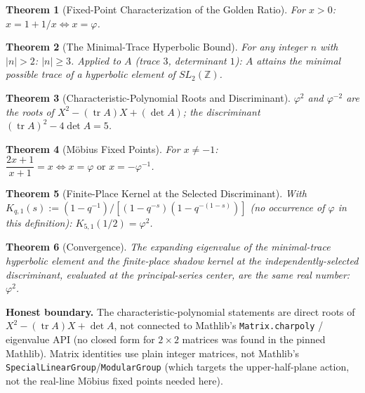 \documentclass{report}
\newtheorem{theorem}{Theorem}[chapter]
\theoremstyle{definition}
\begin{document}
\begin{theorem}[Fixed-Point Characterization of the Golden Ratio]
  \label{thm:golden-fixed-point}
  \leanok
  For $x>0$: $x=1+1/x \iff x=\varphi$.
\end{theorem}

\begin{theorem}[The Minimal-Trace Hyperbolic Bound]
  \label{thm:hyperbolic-trace-bound}
  \leanok
  For any integer $n$ with $|n|>2$: $|n|\geq3$. Applied to $A$ (trace $3$, determinant $1$):
  $A$ attains the minimal possible trace of a hyperbolic element of $SL_2(\mathbb{Z})$.
\end{theorem}

\begin{theorem}[Characteristic-Polynomial Roots and Discriminant]
  \label{thm:golden-charpoly}
  \leanok
  $\varphi^2$ and $\varphi^{-2}$ are the roots of $X^2-(\operatorname{tr}A)X+(\det A)$;
  the discriminant $(\operatorname{tr}A)^2-4\det A = 5$.
\end{theorem}

\begin{theorem}[Möbius Fixed Points]
  \label{thm:golden-mobius}
  \leanok
  For $x\neq-1$: $\dfrac{2x+1}{x+1}=x \iff x=\varphi \text{ or } x=-\varphi^{-1}$.
\end{theorem}

\begin{theorem}[Finite-Place Kernel at the Selected Discriminant]
  \label{thm:golden-kernel}
  \leanok
  With $K_{q,1}(s):=(1-q^{-1})/[(1-q^{-s})(1-q^{-(1-s)})]$ (no occurrence of $\varphi$ in
  this definition): $K_{5,1}(1/2)=\varphi^2$.
\end{theorem}

\begin{theorem}[Convergence]
  \label{thm:golden-convergence}
  \leanok
  The expanding eigenvalue of the minimal-trace hyperbolic element and the finite-place
  shadow kernel at the independently-selected discriminant, evaluated at the
  principal-series center, are the same real number: $\varphi^2$.
\end{theorem}

\textbf{Honest boundary.} The characteristic-polynomial statements are direct roots of
$X^2-(\operatorname{tr}A)X+\det A$, not connected to Mathlib's \texttt{Matrix.charpoly} /
eigenvalue API (no closed form for $2\times2$ matrices was found in the pinned Mathlib).
Matrix identities use plain integer matrices, not Mathlib's
\texttt{SpecialLinearGroup}/\texttt{ModularGroup} (which targets the upper-half-plane
action, not the real-line Möbius fixed points needed here).
\end{document}
